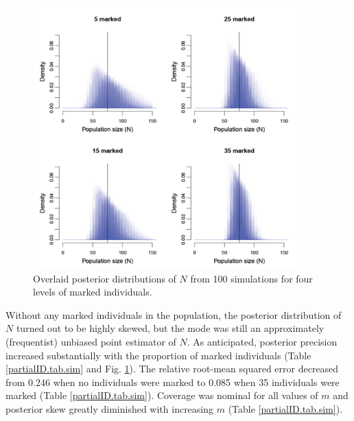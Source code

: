 

\begin{figure}[ht]
  \centering
  \includegraphics[width=4in,height=4in]{Ch19-PartialID/figs/Nposts2.png}
  \caption{Overlaid posterior distributions of $N$ from 100 simulations
    for four levels of marked individuals.}
  \label{partialID.fig.nposts}
\end{figure}

Without any marked individuals in the population, the posterior
distribution of $N$ turned out to be highly skewed, but the mode was
still an approximately (frequentist) unbiased point estimator of
$N$. As anticipated, posterior precision increased substantially with
the proportion of marked individuals (Table \ref{partialID.tab.sim} and
Fig. \ref{partialID.fig.nposts}). The relative root-mean squared
error decreased from 0.246 when no individuals were marked to 0.085
when 35 individuals were marked
(Table \ref{partialID.tab.sim}). Coverage was nominal for all values of
$m$ and posterior skew greatly diminished with increasing $m$ (Table \ref{partialID.tab.sim}).


